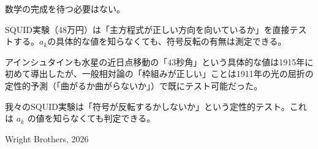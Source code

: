 \documentclass[12pt,a4paper]{article}
\begin{document}
\begin{deepbox}
数学の完成を待つ必要はない。

SQUID実験（48万円）は「主方程式が正しい方向を向いているか」を直接テストする。$a_k$の具体的な値を知らなくても、符号反転の有無は測定できる。

アインシュタインも水星の近日点移動の「43秒角」という具体的な値は1915年に初めて導出したが、一般相対論の「枠組みが正しい」ことは1911年の光の屈折の定性的予測（「曲がるか曲がらないか」）で既にテスト可能だった。

我々のSQUID実験は「符号が反転するかしないか」という定性的テスト。これは $a_k$ の値を知らなくても判定できる。
\end{deepbox}

\vfill
\begin{center}
{\small Wright Brothers, 2026}
\end{center}
\end{document}
